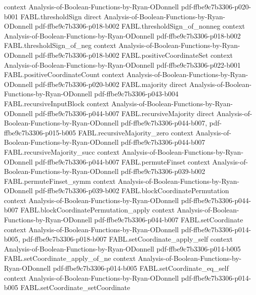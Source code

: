 \begin{theorem}
  {context}
  {Analysis-of-Boolean-Functions-by-Ryan-ODonnell}
  {pdf-ffbe9c7b3306-p020-b001}
\proofstep
  {FABL.thresholdSign}
  {direct}
  {Analysis-of-Boolean-Functions-by-Ryan-ODonnell}
  {pdf-ffbe9c7b3306-p018-b002}
\proofstep
  {FABL.thresholdSign_of_nonneg}
  {context}
  {Analysis-of-Boolean-Functions-by-Ryan-ODonnell}
  {pdf-ffbe9c7b3306-p018-b002}
\proofstep
  {FABL.thresholdSign_of_neg}
  {context}
  {Analysis-of-Boolean-Functions-by-Ryan-ODonnell}
  {pdf-ffbe9c7b3306-p018-b002}
\proofstep
  {FABL.positiveCoordinateSet}
  {context}
  {Analysis-of-Boolean-Functions-by-Ryan-ODonnell}
  {pdf-ffbe9c7b3306-p022-b001}
\proofstep
  {FABL.positiveCoordinateCount}
  {context}
  {Analysis-of-Boolean-Functions-by-Ryan-ODonnell}
  {pdf-ffbe9c7b3306-p020-b002}
\proofstep
  {FABL.majority}
  {direct}
  {Analysis-of-Boolean-Functions-by-Ryan-ODonnell}
  {pdf-ffbe9c7b3306-p043-b004}
\proofstep
  {FABL.recursiveInputBlock}
  {context}
  {Analysis-of-Boolean-Functions-by-Ryan-ODonnell}
  {pdf-ffbe9c7b3306-p044-b007}
\proofstep
  {FABL.recursiveMajority}
  {direct}
  {Analysis-of-Boolean-Functions-by-Ryan-ODonnell}
  {pdf-ffbe9c7b3306-p044-b007,
    pdf-ffbe9c7b3306-p015-b005}
\proofstep
  {FABL.recursiveMajority_zero}
  {context}
  {Analysis-of-Boolean-Functions-by-Ryan-ODonnell}
  {pdf-ffbe9c7b3306-p044-b007}
\proofstep
  {FABL.recursiveMajority_succ}
  {context}
  {Analysis-of-Boolean-Functions-by-Ryan-ODonnell}
  {pdf-ffbe9c7b3306-p044-b007}
\proofstep
  {FABL.permuteFinset}
  {context}
  {Analysis-of-Boolean-Functions-by-Ryan-ODonnell}
  {pdf-ffbe9c7b3306-p039-b002}
\proofstep
  {FABL.permuteFinset_symm}
  {context}
  {Analysis-of-Boolean-Functions-by-Ryan-ODonnell}
  {pdf-ffbe9c7b3306-p039-b002}
\proofstep
  {FABL.blockCoordinatePermutation}
  {context}
  {Analysis-of-Boolean-Functions-by-Ryan-ODonnell}
  {pdf-ffbe9c7b3306-p044-b007}
\proofstep
  {FABL.blockCoordinatePermutation_apply}
  {context}
  {Analysis-of-Boolean-Functions-by-Ryan-ODonnell}
  {pdf-ffbe9c7b3306-p044-b007}
\proofstep
  {FABL.setCoordinate}
  {context}
  {Analysis-of-Boolean-Functions-by-Ryan-ODonnell}
  {pdf-ffbe9c7b3306-p014-b005,
    pdf-ffbe9c7b3306-p018-b007}
\proofstep
  {FABL.setCoordinate_apply_self}
  {context}
  {Analysis-of-Boolean-Functions-by-Ryan-ODonnell}
  {pdf-ffbe9c7b3306-p014-b005}
\proofstep
  {FABL.setCoordinate_apply_of_ne}
  {context}
  {Analysis-of-Boolean-Functions-by-Ryan-ODonnell}
  {pdf-ffbe9c7b3306-p014-b005}
\proofstep
  {FABL.setCoordinate_eq_self}
  {context}
  {Analysis-of-Boolean-Functions-by-Ryan-ODonnell}
  {pdf-ffbe9c7b3306-p014-b005}
\proofstep
  {FABL.setCoordinate_setCoordinate}

\end{theorem}
